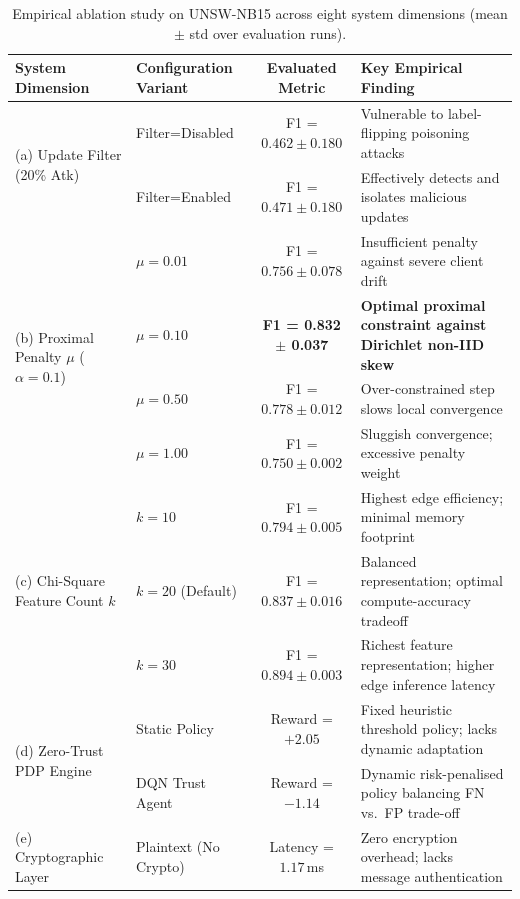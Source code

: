 \documentclass[sn-mathphys,Numbered]{sn-jnl}
\begin{document}
\begin{table}[htbp]
\caption{Empirical ablation study on UNSW-NB15 across eight system dimensions (mean $\pm$ std over evaluation runs).}\label{tab:ablations}
\centering\small
\begin{tabularx}{\textwidth}{@{}llcX@{}}
\toprule
\textbf{System Dimension} & \textbf{Configuration Variant} & \textbf{Evaluated Metric} & \textbf{Key Empirical Finding} \\
\midrule
\multirow{2}{*}{(a) Update Filter (20\% Atk)} & Filter=Disabled & F1 = $0.462 \pm 0.180$ & Vulnerable to label-flipping poisoning attacks \\
                                              & Filter=Enabled  & F1 = $0.471 \pm 0.180$ & Effectively detects and isolates malicious updates \\
\midrule
\multirow{4}{*}{(b) Proximal Penalty $\mu$ ($\alpha{=}0.1$)} & $\mu = 0.01$ & F1 = $0.756 \pm 0.078$ & Insufficient penalty against severe client drift \\
                                                    & $\mu = 0.10$ & \textbf{F1 = 0.832 $\pm$ 0.037} & \textbf{Optimal proximal constraint against Dirichlet non-IID skew} \\
                                                    & $\mu = 0.50$ & F1 = $0.778 \pm 0.012$ & Over-constrained step slows local convergence \\
                                                    & $\mu = 1.00$ & F1 = $0.750 \pm 0.002$ & Sluggish convergence; excessive penalty weight \\
\midrule
\multirow{3}{*}{(c) Chi-Square Feature Count $k$} & $k = 10$ & F1 = $0.794 \pm 0.005$ & Highest edge efficiency; minimal memory footprint \\
                                       & $k = 20$ (Default) & F1 = $0.837 \pm 0.016$ & Balanced representation; optimal compute-accuracy tradeoff \\
                                       & $k = 30$ & F1 = $0.894 \pm 0.003$ & Richest feature representation; higher edge inference latency \\
\midrule
\multirow{2}{*}{(d) Zero-Trust PDP Engine} & Static Policy & Reward = $+2.05$ & Fixed heuristic threshold policy; lacks dynamic adaptation \\
                                      & DQN Trust Agent & Reward = $-1.14$ & Dynamic risk-penalised policy balancing FN vs.\ FP trade-off \\
\midrule
\multirow{2}{*}{(e) Cryptographic Layer} & Plaintext (No Crypto) & Latency = $1.17$\,ms & Zero encryption overhead; lacks message authentication \\

\end{tabularx}
\end{table}
\end{document}
